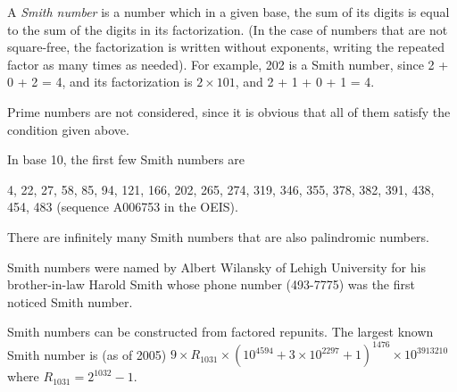 \documentclass[12pt]{article}
\begin{document}
A {\em Smith number} is a number which in a given base, the sum of its digits is equal to the sum of the digits in its factorization. (In the case of numbers that are not square-free, the factorization is written without exponents, writing the repeated factor as many times as needed). For example, 202 is a Smith number, since 2 + 0 + 2 = 4, and its factorization is $2 \times 101$, and 2 + 1 + 0 + 1 = 4.

Prime numbers are not considered, since it is obvious that all of them satisfy the condition given above.

In base 10, the first few Smith numbers are

4, 22, 27, 58, 85, 94, 121, 166, 202, 265, 274, 319, 346, 355, 378, 382, 391, 438, 454, 483 (sequence A006753 in the OEIS).

There are infinitely many Smith numbers that are also palindromic numbers.

Smith numbers were named by Albert Wilansky of Lehigh University for his brother-in-law Harold Smith whose phone number (493-7775) was the first noticed Smith number.

Smith numbers can be constructed from factored repunits. The largest known Smith number is (as of 2005) $9 \times R_{1031} \times (10^{4594} + 3 \times 10^{2297} + 1)^{1476} \times 10^{3913210}$ where $R_{1031} = 2^{1032} - 1$.
\end{document}

